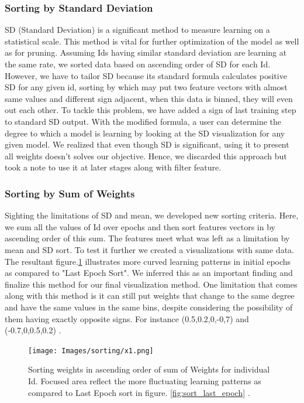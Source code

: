 \documentclass[journal]{vgtc}                %
\begin{document}
\subsubsection{Sorting by Standard Deviation}
SD (Standard Deviation) is a significant method to measure learning on a statistical scale. This method is vital for further optimization of the model as well as for pruning.
Assuming Ids having similar standard deviation are learning
at the same rate, we sorted data based on ascending order of SD for each Id. However, we have to tailor SD because its standard formula calculates positive SD for any
given id, sorting by which may put two feature vectors with almost
same values and different sign adjacent, when this data is binned, they will even out each other.
To tackle this problem, we have added a sign of last training step to standard SD output.  
With the modified formula, a user can determine the degree to which a model is learning
by looking at the SD visualization for any given model.
We realized that even though SD is significant, using it to present all weights
doesn't solves our objective. Hence, we discarded this approach but took a note to use it at later stages along with filter feature.



\subsubsection{Sorting by Sum of Weights }
Sighting the limitations of SD and mean, we developed new sorting criteria.
Here, we sum all the values of Id over epochs and then sort features vectors in by ascending order of this sum.
The features meet what was left as a limitation by mean and SD sort.
To test it further we created a visualizations with same data.
The resultant figure.\ref{fig:row_sum_epoch} illustrates more curved learning patterns in initial epochs as compared to "Last Epoch Sort".
We inferred this as an important finding and finalize this method for our
final visualization method.
One limitation that comes along with this method is it can still put weights
that change to the same degree and have the same values in the same bins,
despite considering the possibility of them having exactly opposite signs. For instance (0.5,0.2,0,-0,7) and (-0.7,0,0.5,0.2) .
\begin{figure}
    \texttt{[image: Images/sorting/x1.png]}
    \caption{Sorting weights in ascending order of sum of Weights for individual Id. Focused area reflect the more fluctuating learning patterns as compared to Last Epoch sort in figure. \ref{fig:sort_last_epoch} .}
    \label{fig:row_sum_epoch}
\end{figure}
\end{document}
